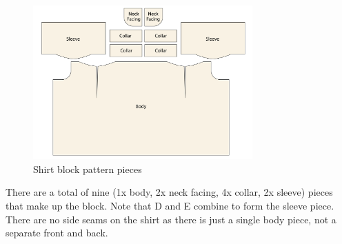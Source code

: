 \begin{figure} [H] %
    \centering %
    \includegraphics[width = 0.75\textwidth]{Images/originalpattern_pieces.png} %
    \caption{Shirt block pattern pieces}
    \label{} %
\end{figure}
There are a total of nine (1x body, 2x neck facing, 4x collar, 2x sleeve) pieces that make up the block. Note that D and E combine to form the sleeve piece. There are no side seams on the shirt as there is just a single body piece, not a separate front and back.

